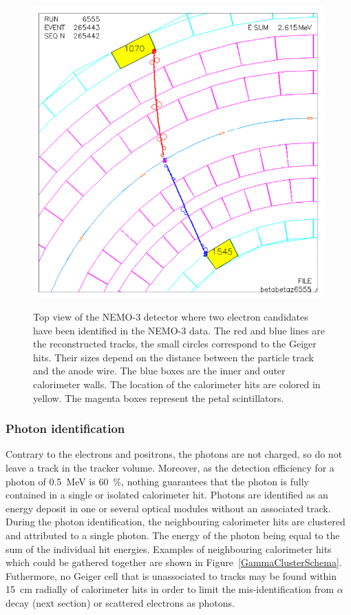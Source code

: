 \documentclass[main.tex]{subfiles}
\begin{document}
\begin{figure}[h!]
\centering
\includegraphics[scale=0.35]{pictures/Chap6/betabetaEvent.png}
\label{DoubleBetaEventDisplay}
\caption{Top view of the NEMO-3 detector where two electron candidates have been identified in the NEMO-3 data. The red and blue lines are the reconstructed tracks, the small circles correspond to the Geiger hits. Their sizes depend on the distance between the particle track and the anode wire. The blue boxes are the inner and outer calorimeter walls. The location of the calorimeter hits are colored in yellow. The magenta boxes represent the petal scintillators.}
\end{figure}

\FloatBarrier

\subsubsection{Photon identification}


\NI Contrary to the electrons and positrons, the photons are not charged, so do not leave a track in the tracker volume. Moreover, as the detection efficiency for a photon of 0.5~MeV is 60~\%, nothing guarantees that the photon is fully contained in a single or isolated calorimeter hit. Photons are identified as an energy deposit in one or several optical modules without an associated track. During the photon identification, the neighbouring calorimeter hits are clustered and attributed to a single photon. The energy of the photon being equal to the sum of the individual hit energies. Examples of neighbouring calorimeter hits which could be gathered together are shown in Figure~\ref{GammaClusterSchema}. Futhermore, no Geiger cell that is unassociated to tracks may be found within 15~cm radially of calorimeter hits in order to limit the mis-identification from $\alpha$ decay (next section) or scattered electrons as photons.
\end{document}
